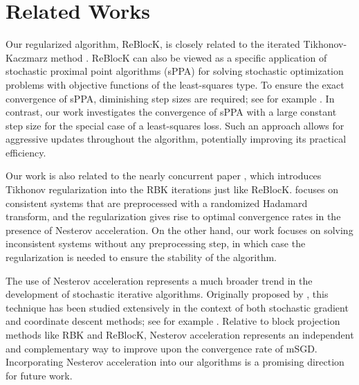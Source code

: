 \section{Related Works}
Our regularized algorithm, ReBlocK, is closely related to the iterated Tikhonov-Kaczmarz method \cite{de2011modified}. ReBlocK can also be viewed as a specific application of stochastic proximal point algorithms (sPPA) \cite{bertsekas2011incremental,asi2019stochastic,davis2019stochastic} for solving stochastic optimization problems with objective functions of the least-squares type. To ensure the exact convergence of sPPA, diminishing step sizes are required; see for example \cite{puatracscu2021new}. In contrast, our work investigates the convergence of sPPA with a large constant step size for the special case of a least-squares loss. Such an approach allows for aggressive updates throughout the algorithm, potentially improving its practical efficiency. 

Our work is also related to the nearly concurrent paper \cite{derezinski2025}, which introduces Tikhonov regularization into the RBK iterations just like ReBlocK. \cite{derezinski2025} focuses on consistent systems that are preprocessed with a randomized Hadamard transform, and the regularization gives rise to optimal convergence rates in the presence of Nesterov acceleration. On the other hand, our work focuses on solving inconsistent systems without any preprocessing step, in which case the regularization is needed to ensure the stability of the algorithm.

The use of Nesterov acceleration represents a much broader trend in the development of stochastic iterative algorithms. Originally proposed by \cite{nesterov1983method}, this technique has been studied extensively in the context of both stochastic gradient and coordinate descent methods; see for example \cite{shalev2013accelerated,allen2016even,jain2018accelerating,agarwal2020leverage}. Relative to block projection methods like RBK and ReBlocK, Nesterov acceleration represents an independent and complementary way to improve upon the convergence rate of mSGD. Incorporating Nesterov acceleration into our algorithms is a promising direction for future work.